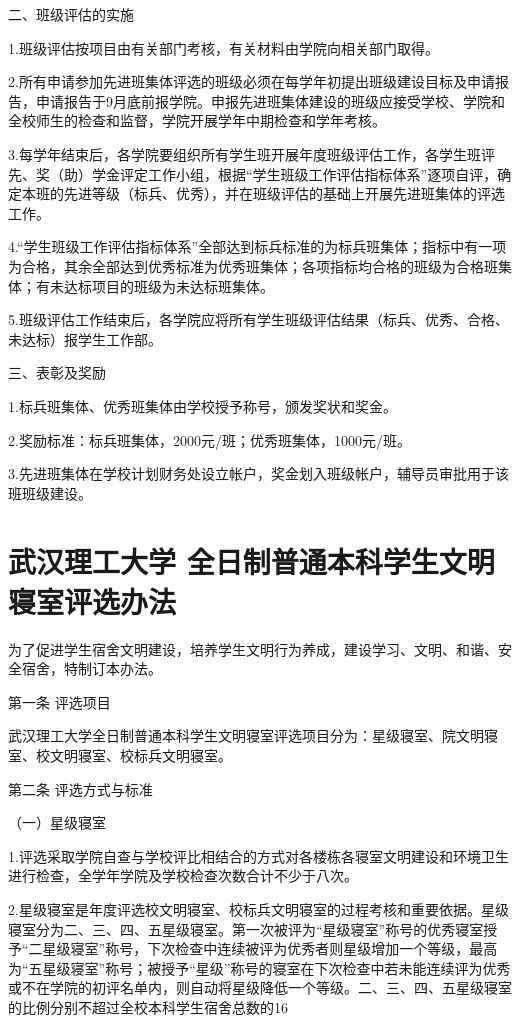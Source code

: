 \documentclass[UTF8,12pt,a4paper]{report}
\begin{document}
二、班级评估的实施

1.班级评估按项目由有关部门考核，有关材料由学院向相关部门取得。

2.所有申请参加先进班集体评选的班级必须在每学年初提出班级建设目标及申请报告，申请报告于9月底前报学院。申报先进班集体建设的班级应接受学校、学院和全校师生的检查和监督，学院开展学年中期检查和学年考核。

3.每学年结束后，各学院要组织所有学生班开展年度班级评估工作，各学生班评先、奖（助）学金评定工作小组，根据“学生班级工作评估指标体系”逐项自评，确定本班的先进等级（标兵、优秀），并在班级评估的基础上开展先进班集体的评选工作。

4.“学生班级工作评估指标体系”全部达到标兵标准的为标兵班集体；指标中有一项为合格，其余全部达到优秀标准为优秀班集体；各项指标均合格的班级为合格班集体；有未达标项目的班级为未达标班集体。

5.班级评估工作结束后，各学院应将所有学生班级评估结果（标兵、优秀、合格、未达标）报学生工作部。

三、表彰及奖励

1.标兵班集体、优秀班集体由学校授予称号，颁发奖状和奖金。

2.奖励标准：标兵班集体，2000元/班；优秀班集体，1000元/班。

3.先进班集体在学校计划财务处设立帐户，奖金划入班级帐户，辅导员审批用于该班班级建设。
\chapter{武汉理工大学 全日制普通本科学生文明寝室评选办法}
为了促进学生宿舍文明建设，培养学生文明行为养成，建设学习、文明、和谐、安全宿舍，特制订本办法。

第一条 评选项目

武汉理工大学全日制普通本科学生文明寝室评选项目分为：星级寝室、院文明寝室、校文明寝室、校标兵文明寝室。

第二条 评选方式与标准

（一）星级寝室

1.评选采取学院自查与学校评比相结合的方式对各楼栋各寝室文明建设和环境卫生进行检查，全学年学院及学校检查次数合计不少于八次。

2.星级寝室是年度评选校文明寝室、校标兵文明寝室的过程考核和重要依据。星级寝室分为二、三、四、五星级寝室。第一次被评为“星级寝室”称号的优秀寝室授予“二星级寝室”称号，下次检查中连续被评为优秀者则星级增加一个等级，最高为“五星级寝室”称号；被授予“星级”称号的寝室在下次检查中若未能连续评为优秀或不在学院的初评名单内，则自动将星级降低一个等级。二、三、四、五星级寝室的比例分别不超过全校本科学生宿舍总数的16%
\end{document}
